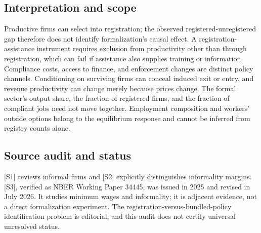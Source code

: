 \documentclass[11pt,a4paper]{article}
\begin{document}
\subsection*{Interpretation and scope}
Productive firms can select into registration; the observed registered-unregistered gap therefore does not identify formalization's causal effect. A registration-assistance instrument requires exclusion from productivity other than through registration, which can fail if assistance also supplies training or information. Compliance costs, access to finance, and enforcement changes are distinct policy channels. Conditioning on surviving firms can conceal induced exit or entry, and revenue productivity can change merely because prices change. The formal sector's output share, the fraction of registered firms, and the fraction of compliant jobs need not move together. Employment composition and workers' outside options belong to the equilibrium response and cannot be inferred from registry counts alone.
\subsection*{Source audit and status}
[S1] reviews informal firms and [S2] explicitly distinguishes informality margins. [S3], verified as NBER Working Paper 34445, was issued in 2025 and revised in July 2026. It studies minimum wages and informality; it is adjacent evidence, not a direct formalization experiment. The registration-versus-bundled-policy identification problem is editorial, and this audit does not certify universal unresolved status.
\end{document}
